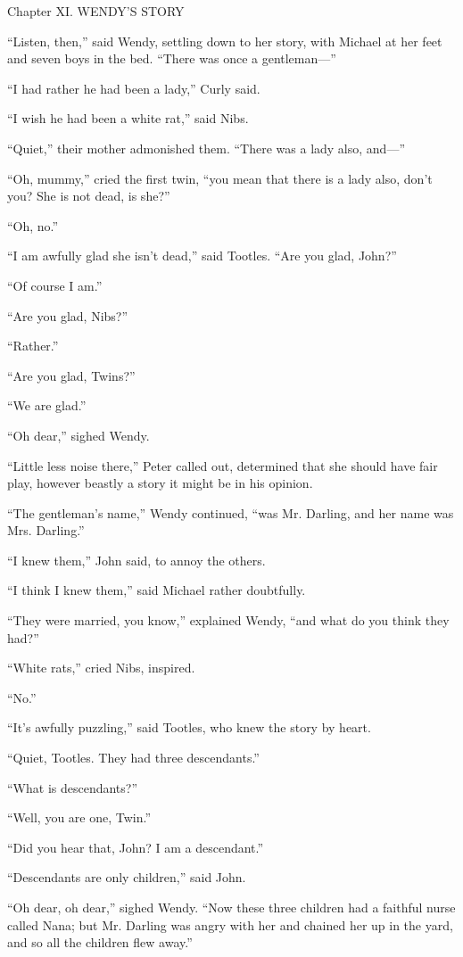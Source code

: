 Chapter XI.
WENDY'S STORY


``Listen, then,'' said Wendy, settling down to her story, with Michael at
her feet and seven boys in the bed. ``There was once a gentleman—''

``I had rather he had been a lady,'' Curly said.

``I wish he had been a white rat,'' said Nibs.

``Quiet,'' their mother admonished them. ``There was a lady also, and—''

``Oh, mummy,'' cried the first twin, ``you mean that there is a lady also,
don't you? She is not dead, is she?''

``Oh, no.''

``I am awfully glad she isn't dead,'' said Tootles. ``Are you glad, John?''

``Of course I am.''

``Are you glad, Nibs?''

``Rather.''

``Are you glad, Twins?''

``We are glad.''

``Oh dear,'' sighed Wendy.

``Little less noise there,'' Peter called out, determined that she should
have fair play, however beastly a story it might be in his opinion.

``The gentleman's name,'' Wendy continued, ``was Mr. Darling, and her name
was Mrs. Darling.''

``I knew them,'' John said, to annoy the others.

``I think I knew them,'' said Michael rather doubtfully.

``They were married, you know,'' explained Wendy, ``and what do you think
they had?''

``White rats,'' cried Nibs, inspired.

``No.''

``It's awfully puzzling,'' said Tootles, who knew the story by heart.

``Quiet, Tootles. They had three descendants.''

``What is descendants?''

``Well, you are one, Twin.''

``Did you hear that, John? I am a descendant.''

``Descendants are only children,'' said John.

``Oh dear, oh dear,'' sighed Wendy. ``Now these three children had a
faithful nurse called Nana; but Mr. Darling was angry with her and
chained her up in the yard, and so all the children flew away.''

